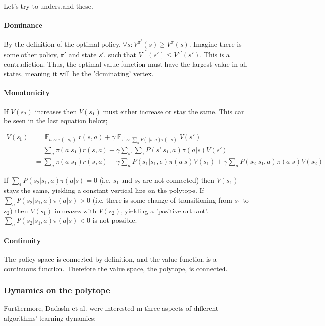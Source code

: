 Let's try to understand these.

\paragraph{Dominance} By the definition of the optimal policy, $\forall s: V^{\pi^{*}}(s)\ge V^{\pi}(s)$.
Imagine there is some other policy, $\pi'$ and state $s'$, such that $V^{\pi^{*}}(s')\le V^{\pi'}(s')$. This is a contradiction.
Thus, the optimal value function must have the largest value in all states, meaning it will be the 'dominating' vertex.

\paragraph{Monotonicity} If $V(s_2)$ increases then $V(s_1)$ must either increase or stay the same.
This can be seen in the last equation below;

\begin{align*}
V(s_1) &= \mathop{\mathbb E}_{a \sim\pi(\cdot|s_1)} r(s, a) + \gamma \mathop{\mathbb E}_{s'\sim \sum_a P(\cdot|s, a)\pi(\cdot|s)} V(s')\\
&= \sum_a \pi(a|s_1)r(s, a) + \gamma \sum_{s'}\sum_a P(s'|s_1, a)\pi(a|s) V(s') \\
&= \sum_a \pi(a|s_1)r(s, a) + \gamma \sum_a P(s_1|s_1, a)\pi(a|s) V(s_1) + \gamma\sum_a P(s_2|s_1, a)\pi(a|s) V(s_2)
\end{align*}

If $\sum_a P(s_2|s_1, a)\pi(a|s) = 0$ (i.e. $s_1$ and $s_2$ are not connected)
then $V(s_1)$ stays the same, yielding a constant vertical line on the polytope.
If $\sum_a P(s_2|s_1, a)\pi(a|s) > 0$ (i.e. there is some change of transitioning from $s_1$ to $s_2$)
then $V(s_1)$ increases with $V(s_2)$, yielding a 'positive orthant'.
$\sum_a P(s_2|s_1, a)\pi(a|s) < 0$ is not possible.

\paragraph{Continuity} The policy space is connected by definition, and the value function is a continuous function.
Therefore the value space, the polytope, is connected.

\subsubsection{Dynamics on the polytope}

Furthermore, Dadashi et al. \cite{Dadashi2018} were interested in three aspects of different algorithms’ learning dynamics;

